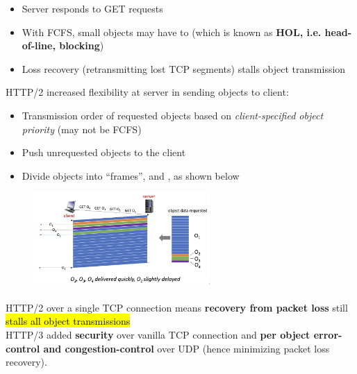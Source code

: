\documentclass[12pt,a4paper]{article}
\begin{document}
\begin{itemize}
  \item Server responds  to GET requests
  \item With FCFS, small objects may have to  (which is known as \textbf{HOL, i.e. head-of-line, blocking})
  \item Loss recovery (retransmitting lost TCP segments) stalls object transmission
\end{itemize}


\noindent HTTP/2 increased flexibility at server in sending objects to client: \\
\begin{itemize}
  \item Transmission order of requested objects based on \textit{client-specified object priority} (may not be FCFS)
  \item Push unrequested objects to the client
  \item Divide objects into ``frames'', and , as shown below
\end{itemize}

\vspace{-1.0em}\begin{figure}[h]
  \centering
  \includegraphics[width=0.6\textwidth]{ch2_img/http2.png}
\end{figure}


\noindent HTTP/2 over a single TCP connection means \textbf{recovery from packet loss} still \hl{stalls all object transmissions} \\

\noindent HTTP/3 added \textbf{security} over vanilla TCP connection and \textbf{per object error-control and congestion-control} over UDP (hence minimizing packet loss recovery).

\vspace{1.0em}
\end{document}
